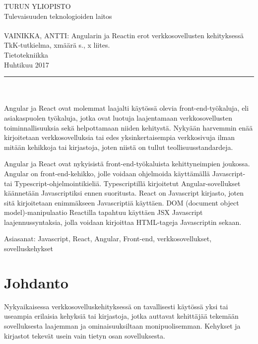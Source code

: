 \documentclass[a4paper,12pt,twoside]{article} %
\renewcommand{\baselinestretch}{1}
\begin{document}
\begin{minipage}{15cm}

\noindent
TURUN YLIOPISTO\\
Tulevaisuuden teknologioiden laitos\\
\\
VAINIKKA, ANTTI: Angularin ja Reactin erot verkkosovellusten kehityksessä\\
TkK-tutkielma, xmäärä s., x liites.\\
Tietotekniikka\\
Huhtikuu 2017\\
\rule{\textwidth}{.2mm}\\
\\
Angular ja React ovat molemmat laajalti käytössä olevia front-end-työkaluja, eli asiakaspuolen työkaluja, jotka ovat luotuja laajentamaan verkkosovellusten toiminnallisuuksia sekä helpottamaan niiden kehitystä. Nykyään harvemmin enää kirjoitetaan verkkosovelluksia tai edes yksinkertaisempia verkkosivuja ilman mitään kehikkoja tai kirjastoja, joten niistä on tullut teollisuusstandardeja.

\vspace{4mm}\noindent Angular ja React ovat nykyisistä front-end-työkaluista kehittyneimpien joukossa. Angular on front-end-kehikko, jolle voidaan ohjelmoida käyttämällä Javascript- tai Typescript-ohjelmointikieliä. Typescriptillä kirjoitetut Angular-sovellukset käännetään Javascriptiksi ennen suoritusta. React on Javascript kirjasto, joten sitä kirjoitetaan enimmäkseen Javascriptiä käyttäen. DOM (document object model)-manipulaatio Reactilla tapahtuu käyttäen JSX Javascript laajennussyntaksia, jolla voidaan kirjoittaa HTML-tageja Javascriptin sekaan.

\vspace{4mm}\noindent Asiasanat: Javascript, React, Angular, Front-end, verkkosovellukset, sovelluskehykset

\end{minipage}
\newpage
\tableofcontents
\newpage
\pagestyle{plain} 
\setcounter{page}{1}

\addtolength{\oddsidemargin}{1.1cm}
\addtolength{\voffset}{2.3cm}

\section{Johdanto}
\renewcommand{\baselinestretch}{2}

Nykyaikaisessa verkkosovelluskehityksessä on tavallisesti käytössä yksi tai useampia erilaisia kehyksiä tai kirjastoja, jotka auttavat kehittäjää tekemään sovelluksesta laajemman ja ominaisuuksiltaan monipuolisemman. Kehykset ja kirjastot tekevät usein vain tietyn osan sovelluksesta.
\end{document}
